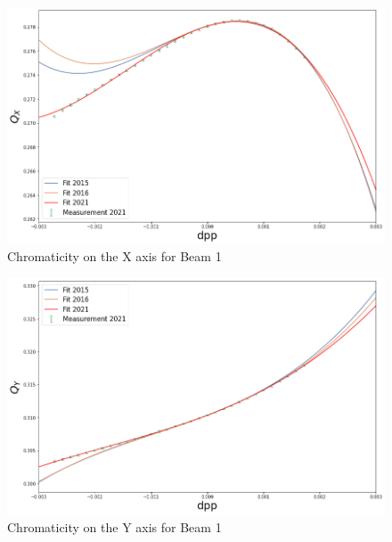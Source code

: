 \documentclass[a4paper]{cernatsnote}
\begin{document}
\begin{figure}[H]
  \centering
  \includegraphics[width=.8\linewidth]{plots/beam1/qxb1.png}  
  \caption{Chromaticity on the X axis for Beam 1}
\end{figure}
\begin{figure}[H]
  \centering
  \includegraphics[width=.8\linewidth]{plots/beam1/qyb1.png}  
  \caption{Chromaticity on the Y axis for Beam 1}
\end{figure}
\end{document}
